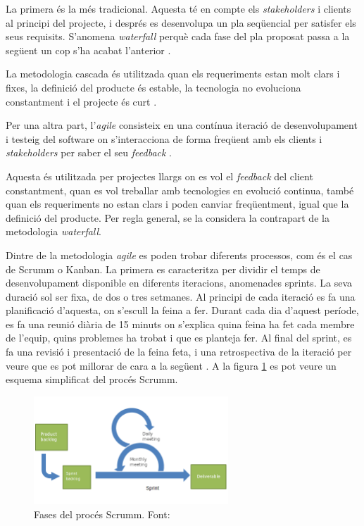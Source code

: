 \documentclass[a4paper]{article}
\begin{document}
La primera és la més tradicional. Aquesta té en compte els \textit{stakeholders} i clients al principi del projecte, i després es desenvolupa un pla seqüencial per satisfer els seus requisits. S'anomena \textit{waterfall} perquè cada fase del pla proposat passa a la següent un cop s'ha acabat l'anterior \cite{waterfallModel}.

La metodologia cascada és utilitzada quan els requeriments estan molt clars i fixes, la definició del producte és estable, la tecnologia no evoluciona constantment i el projecte és curt \cite{waterfallTutorialsPoint}.

Per una altra part, l'\textit{agile} consisteix en una contínua iteració de desenvolupament i testeig del software on s'interacciona de forma freqüent amb els clients i \textit{stakeholders} per saber el seu \textit{feedback} \cite{agileVsWaterfall}.

Aquesta és utilitzada per projectes llargs on es vol el \textit{feedback} del client constantment, quan es vol treballar amb tecnologies en evolució continua, també quan els requeriments no estan clars i poden canviar freqüentment, igual que la definició del producte. Per regla general, se la considera la contrapart de la metodologia \textit{waterfall}. 

Dintre de la metodologia \textit{agile} es poden trobar diferents processos, com és el cas de Scrumm o Kanban. La primera es caracteritza per dividir el temps de desenvolupament disponible en diferents iteracions, anomenades sprints. La seva duració sol ser fixa,  de dos o tres setmanes. Al principi de cada iteració es fa una planificació d'aquesta, on s'escull la feina a fer. Durant cada dia d'aquest període, es fa una reunió diària de 15 minuts on s'explica quina feina ha fet cada membre de l'equip, quins problemes ha trobat i que es planteja fer. Al final del sprint, es fa una revisió i presentació de la feina feta, i una retrospectiva de la iteració per veure que es pot millorar de cara a la següent \cite{wikipediaScrum}. A la figura \ref{fig:ScrummImage} es pot veure un esquema simplificat del procés Scrumm.

\begin{figure}[H]
    \centering
    \includegraphics[width=0.65\textwidth]{images/Scrumm.png}
    \caption[Fases del procés Scrumm]{Fases del procés Scrumm. Font: \cite{wikipediaScrum}}
    \label{fig:ScrummImage}
\end{figure}
\end{document}
